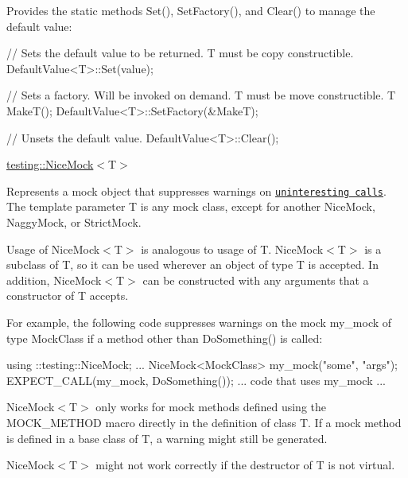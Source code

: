 Provides the static methods {\ttfamily Set()}, {\ttfamily Set\+Factory()}, and {\ttfamily Clear()} to manage the default value\+:


\begin{DoxyCode}
\textcolor{comment}{// Sets the default value to be returned. T must be copy constructible.}
DefaultValue<T>::Set(value);

\textcolor{comment}{// Sets a factory. Will be invoked on demand. T must be move constructible.}
T MakeT();
DefaultValue<T>::SetFactory(&MakeT);

\textcolor{comment}{// Unsets the default value.}
DefaultValue<T>::Clear();
\end{DoxyCode}


{\ttfamily \mbox{\hyperlink{classtesting_1_1NiceMock}{testing\+::\+Nice\+Mock}}$<$T$>$}

Represents a mock object that suppresses warnings on \href{../gmock_cook_book.md#uninteresting-vs-unexpected}{\tt uninteresting calls}. The template parameter {\ttfamily T} is any mock class, except for another {\ttfamily Nice\+Mock}, {\ttfamily Naggy\+Mock}, or {\ttfamily Strict\+Mock}.

Usage of {\ttfamily Nice\+Mock$<$T$>$} is analogous to usage of {\ttfamily T}. {\ttfamily Nice\+Mock$<$T$>$} is a subclass of {\ttfamily T}, so it can be used wherever an object of type {\ttfamily T} is accepted. In addition, {\ttfamily Nice\+Mock$<$T$>$} can be constructed with any arguments that a constructor of {\ttfamily T} accepts.

For example, the following code suppresses warnings on the mock {\ttfamily my\+\_\+mock} of type {\ttfamily Mock\+Class} if a method other than {\ttfamily Do\+Something()} is called\+:


\begin{DoxyCode}
using ::testing::NiceMock;
...
NiceMock<MockClass> my\_mock(\textcolor{stringliteral}{"some"}, \textcolor{stringliteral}{"args"});
EXPECT\_CALL(my\_mock, DoSomething());
... code that uses my\_mock ...
\end{DoxyCode}


{\ttfamily Nice\+Mock$<$T$>$} only works for mock methods defined using the {\ttfamily M\+O\+C\+K\+\_\+\+M\+E\+T\+H\+OD} macro directly in the definition of class {\ttfamily T}. If a mock method is defined in a base class of {\ttfamily T}, a warning might still be generated.

{\ttfamily Nice\+Mock$<$T$>$} might not work correctly if the destructor of {\ttfamily T} is not virtual.

